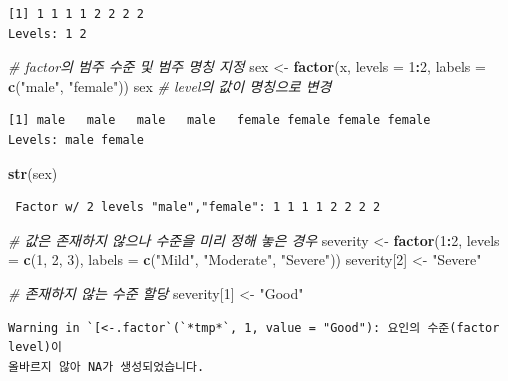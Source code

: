 \documentclass[
  11pt,
]{krantz}
\newenvironment{Shaded}{\begin{snugshade}}{\end{snugshade}}
\newcommand{\CommentTok}[1]{\textcolor[rgb]{0.37,0.37,0.37}{\textit{#1}}}
\newcommand{\DataTypeTok}[1]{\textcolor[rgb]{0.27,0.27,0.27}{#1}}
\newcommand{\DecValTok}[1]{\textcolor[rgb]{0.06,0.06,0.06}{#1}}
\newcommand{\KeywordTok}[1]{\textcolor[rgb]{0.27,0.27,0.27}{\textbf{#1}}}
\newcommand{\NormalTok}[1]{#1}
\newcommand{\OperatorTok}[1]{\textcolor[rgb]{0.43,0.43,0.43}{\textbf{#1}}}
\newcommand{\StringTok}[1]{\textcolor[rgb]{0.5,0.5,0.5}{#1}}
\begin{document}
\begin{verbatim}
[1] 1 1 1 1 2 2 2 2
Levels: 1 2
\end{verbatim}

\begin{Shaded}
\begin{Highlighting}[]
\CommentTok{# factor의 범주 수준 및 범주 명칭 지정}
\NormalTok{sex <-}\StringTok{ }\KeywordTok{factor}\NormalTok{(x, }\DataTypeTok{levels =} \DecValTok{1}\OperatorTok{:}\DecValTok{2}\NormalTok{, }\DataTypeTok{labels =} \KeywordTok{c}\NormalTok{(}\StringTok{"male"}\NormalTok{, }\StringTok{"female"}\NormalTok{))}
\NormalTok{sex }\CommentTok{# level의 값이 명칭으로 변경}
\end{Highlighting}
\end{Shaded}

\begin{verbatim}
[1] male   male   male   male   female female female female
Levels: male female
\end{verbatim}

\begin{Shaded}
\begin{Highlighting}[]
\KeywordTok{str}\NormalTok{(sex)}
\end{Highlighting}
\end{Shaded}

\begin{verbatim}
 Factor w/ 2 levels "male","female": 1 1 1 1 2 2 2 2
\end{verbatim}

\begin{Shaded}
\begin{Highlighting}[]
\CommentTok{# 값은 존재하지 않으나 수준을 미리 정해 놓은 경우}
\NormalTok{severity <-}\StringTok{ }\KeywordTok{factor}\NormalTok{(}\DecValTok{1}\OperatorTok{:}\DecValTok{2}\NormalTok{, }\DataTypeTok{levels =} \KeywordTok{c}\NormalTok{(}\DecValTok{1}\NormalTok{, }\DecValTok{2}\NormalTok{, }\DecValTok{3}\NormalTok{), }\DataTypeTok{labels =} \KeywordTok{c}\NormalTok{(}\StringTok{"Mild"}\NormalTok{, }\StringTok{"Moderate"}\NormalTok{, }\StringTok{"Severe"}\NormalTok{))}
\NormalTok{severity[}\DecValTok{2}\NormalTok{] <-}\StringTok{ "Severe"}

\CommentTok{# 존재하지 않는 수준 할당 }
\NormalTok{severity[}\DecValTok{1}\NormalTok{] <-}\StringTok{ "Good"}
\end{Highlighting}
\end{Shaded}

\begin{verbatim}
Warning in `[<-.factor`(`*tmp*`, 1, value = "Good"): 요인의 수준(factor level)이
올바르지 않아 NA가 생성되었습니다.
\end{verbatim}
\end{document}
